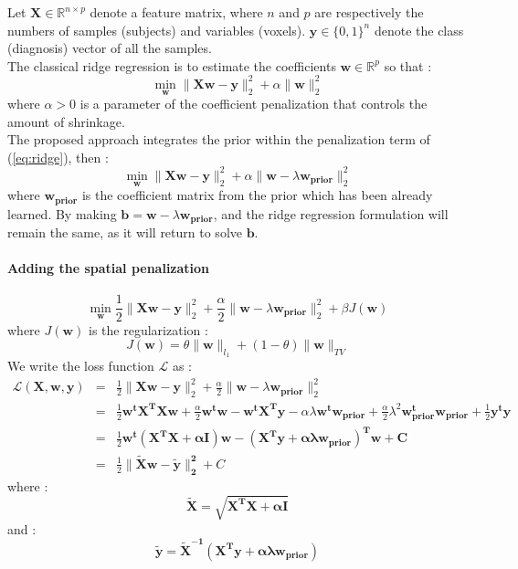 \documentclass[12pt]{article}
\newcommand{\B}[1]{\mathbf{#1}}
\begin{document}
Let $\B X \in \mathbb{R}^{n \times p}$ denote a feature matrix, where $n$ and $p$ are respectively the numbers of samples (subjects) and variables (voxels).
$\B y \in \{0, 1\}^{n} $ denote the class (diagnosis) vector of all the samples.
\\
The classical ridge regression is to estimate the coefficients $\B w \in \mathbb{R}^{p}$ so that :
\begin{equation}
	\min_{\B w} \| \B{Xw - y} \|_2^2 + \alpha \|\B w\|_2^2
	\label{eq:ridge}
\end{equation}
where $\alpha > 0$ is a parameter of the coefficient penalization that controls the amount of shrinkage.
\\
The proposed approach integrates the prior within the penalization term of (\ref{eq:ridge}), then :
\begin{equation}
	\min_{\B w} \| \B{Xw - y} \|_2^2 + \alpha \|\B w - \lambda \B{ w_{prior}}\|_2^2
\end{equation}
where $\B{ w_{prior}}$ is the coefficient matrix from the prior which has been already learned.
By making $\B b = \B w - \lambda \B{ w_{prior}}$, and the ridge regression formulation will remain the same, as it will return to solve $\B b$.

\paragraph{Adding the spatial penalization}
\begin{equation}
	\min_{\B w} \frac{1}{2} \| \B{Xw - y} \|_2^2 + \frac{\alpha}{2} \|\B w - \lambda \B{ w_{prior}}\|_2^2 + \beta J(\B w)
\end{equation}
where $J(\B w)$ is the regularization :
\begin{equation}
	J(\B w) = \theta \| \B w \|_{{l}_1} + (1-\theta)\| \B w \|_{TV}
\end{equation}
We write the loss function $\mathcal{L}$ as :
\begin{eqnarray*}
	\mathcal{L}(\B{X, w, y}) & = & \frac{1}{2} \| \B{Xw - y} \|_2^2 + \frac{\alpha}{2} \|\B w - \lambda \B{ w_{prior}}\|_2^2 \\
	& = & \frac{1}{2}\B{w^tX^TXw} + \frac{\alpha}{2} \B{w^tw} - \B{w^tX^Ty} - \alpha \lambda \B{w^tw_{prior}} + \frac{\alpha}{2} \lambda^2 \B{w_{prior}^tw_{prior}} + \frac{1}{2}\B{y^ty} \\
	& = & \frac{1}{2} \B{ w^t (X^T X+\alpha I) w - (X^T y + \alpha \lambda w_{prior})^T w + C} \\
	& = & \frac{1}{2} \B{\| \tilde{X}w - \tilde{y} \|_2^2} + C
\end{eqnarray*}
where :
\begin{equation}
	\B{ \tilde{X} = \sqrt{X^TX+\alpha I}}
\end{equation}
and :
\begin{equation}
	\B{ \tilde{y} = \tilde{X}^{-1}(X^Ty+\alpha \lambda w_{prior})}
\end{equation}
\end{document}
